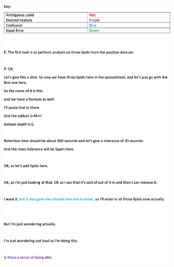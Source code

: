 \documentclass{l4proj}
\begin{document}
\begin{figure}
    \begin{subfigure}{0.5\textwidth}
        \centering
        \includegraphics[width=\textwidth]{dissertation/images/transcript_page_1.png}    
        \label{fig:final} 
    \end{subfigure}
        \begin{subfigure}{0.5\textwidth}
        \centering

\end{subfigure}
\end{figure}
\end{document}
